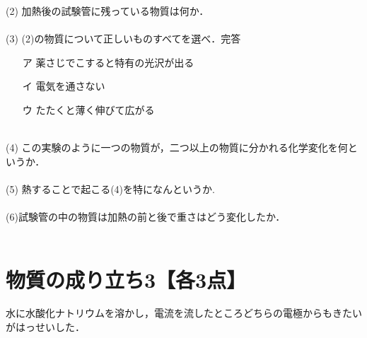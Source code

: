\documentclass[autodetect-engine,dvi=dvipdfmx,ja=standard,
               a4j,11pt]{bxjsarticle}
\begin{document}
    (2) 加熱後の試験管に残っている物質は何か．\\\\

    (3) (2)の物質について正しいものすべてを選べ．完答
    \begin{itemize}
        \item [ア]  薬さじでこすると特有の光沢が出る\\
        \item [イ]  電気を通さない\\
        \item [ウ]  たたくと薄く伸びて広がる\\\\
    \end{itemize}
    

    (4) この実験のように一つの物質が，二つ以上の物質に分かれる化学変化を何というか．\\\\

    (5) 熱することで起こる(4)を特になんというか.\\\\

    (6)試験管の中の物質は加熱の前と後で重さはどう変化したか．\\\\
    \clearpage
\section{物質の成り立ち3【各3点】}
\begin{figure}[htb]
        \centering
        \vspace{20pt} %
        \caption{}
\end{figure}
水に水酸化ナトリウムを溶かし，電流を流したところどちらの電極からもきたいがはっせいした．\\\\
\end{document}
